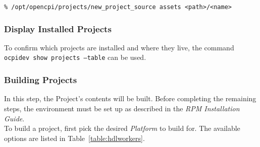 \verb+% /opt/opencpi/projects/new_project_source assets <path>/<name>+

\subsubsection{Display Installed Projects}
To confirm which projects are installed and where they live, the command \texttt{ocpidev show projects --table} can be used.
\subsubsection{Building Projects}
\label{subsubsec:buildworkers}
In this step, the Project's contents will be built. Before completing the remaining steps, the environment must be set up as described in the \textit{RPM Installation Guide}.\\

To build a project, first pick the desired \textit{Platform} to build for. The available options are listed in Table~\ref{table:hdlworkers}.

